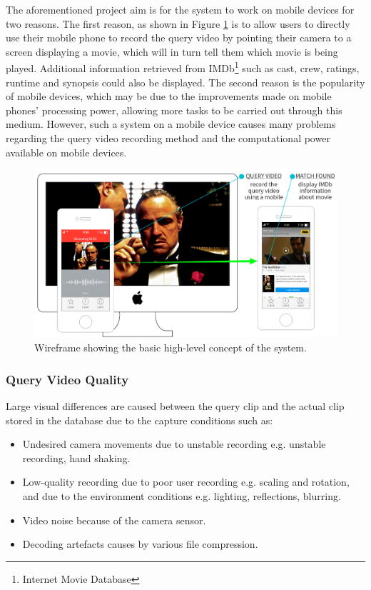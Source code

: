 \documentclass[11pt,openany,a4paper]{article}
\begin{document}
The aforementioned project aim is for the system to work on mobile devices for two reasons. The first reason, as shown in Figure \ref{fig:wireframe} is to allow users to directly use their mobile phone to record the query video by pointing their camera to a screen displaying a movie, which will in turn tell them which movie is being played. Additional information retrieved from IMDb\footnote{Internet Movie Database} such as cast, crew, ratings, runtime and synopsis could also be displayed. The second reason is the popularity of mobile devices, which may be due to the improvements made on mobile phones' processing power, allowing more tasks to be carried out through this medium. However, such a system on a mobile device causes many problems regarding the query video recording method and the computational power available on mobile devices.\\

\begin{figure}[h]
\centerline{\includegraphics[width=1.25\textwidth]{figures/system_wireframe.png}}
\caption{\label{fig:wireframe}Wireframe showing the basic high-level concept of the system.}
\end{figure}

\subsubsection{Query Video Quality}
\label{sec:query-video-challenges}

Large visual differences are caused between the query clip and the actual clip stored in the database due to the capture conditions \cite{liu2014mobilevideosearch, wang2016actionregonition} such as:
\begin{itemize}
    \item Undesired camera movements due to unstable recording e.g. unstable recording, hand shaking.
    \item Low-quality recording due to poor user recording e.g. scaling and rotation, and due to the environment conditions e.g. lighting, reflections, blurring.
    \item Video noise because of the camera sensor.
    \item Decoding artefacts causes by various file compression.
\end{itemize}
\end{document}
